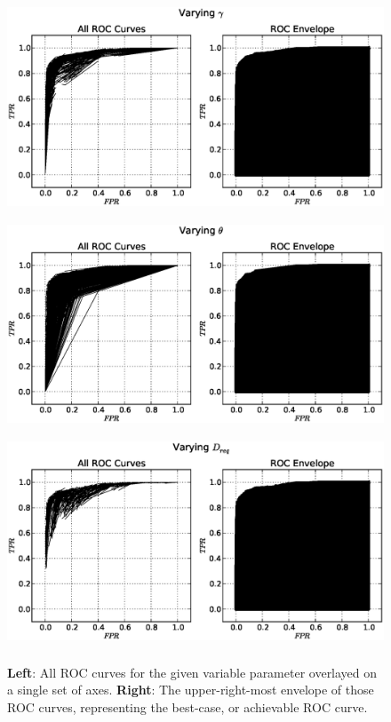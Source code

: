 \begin{figure}[!h]
\begin{center}
\includegraphics[height=2.5in]{../fig/final/roc_env/gamma}
\includegraphics[height=2.5in]{../fig/final/roc_env/theta}
\includegraphics[height=2.5in]{../fig/final/roc_env/dreq}
\end{center}
\caption{\label{fig:roc_env2} {\bf Left}: All ROC curves for the given variable
  parameter overlayed on a single set of axes. {\bf Right}: The upper-right-most
  envelope of those ROC curves, representing the best-case, or achievable ROC
  curve.  }
\end{figure}


